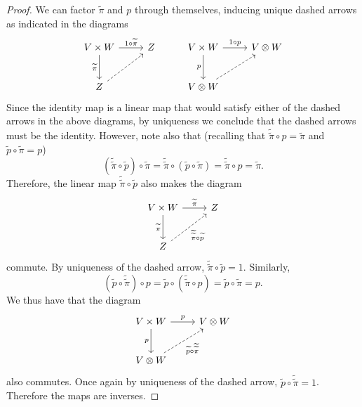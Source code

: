\documentclass[11pt, letterpaper]{article}
\begin{document}
\begin{proof}
	We can factor $\widetilde{\pi } $ and $p$ through themselves, inducing unique dashed arrows as indicated in the diagrams
	\[\begin{tikzcd}[row sep = 2.5em, column sep = 2.5em]
	V\times W \ar[" \widetilde{\pi }  "', d] \ar[" 1 \circ \widetilde{\pi }  ", r]  & Z & V\times W \ar[" p "', d] \ar[" 1\circ p ", r]  & V\otimes W \\
	Z \ar[dashed, ur]  &  & V\otimes W \ar[dashed, ur]  & 
	\end{tikzcd}\]
	Since the identity map is a linear map that would satisfy either of the dashed arrows in the above diagrams, by uniqueness we conclude that the dashed arrows must be the identity. However, note also that (recalling that $\widetilde{\widetilde{\pi } } \circ p= \widetilde{\pi } $ and $\widetilde{p} \circ \widetilde{\pi } =p$)
	\[
		(\widetilde{\widetilde{\pi } } \circ \widetilde{p})\circ \widetilde{\pi } =\widetilde{\widetilde{\pi } } \circ (\widetilde{p} \circ \widetilde{\pi } )=\widetilde{\widetilde{\pi } } \circ p=\widetilde{\pi } 
	.\]
	Therefore, the linear map $\widetilde{\widetilde{\pi } } \circ \widetilde{p} $ also makes the diagram
	\[\begin{tikzcd}[row sep = 2.5em, column sep = 2.5em]
	V\times W \ar[" \widetilde{\pi }  ", r] \ar[" \widetilde{\pi }  "', d]  & Z \\
	Z \ar[" \widetilde{\widetilde{\pi } } \circ \widetilde{p} "', dashed, ur]  & 
	\end{tikzcd}\]
	commute. By uniqueness of the dashed arrow, $\widetilde{\widetilde{\pi } } \circ \widetilde{p} =1$. Similarly,
	\[
		(\widetilde{p} \circ \widetilde{\widetilde{\pi } } )\circ p = \widetilde{p} \circ (\widetilde{\widetilde{\pi } } \circ p)=\widetilde{p} \circ \widetilde{\pi } =p
	.\]
	We thus have that the diagram
	\[\begin{tikzcd}[row sep = 2.5em, column sep = 2.5em]
	V\times W \ar[" p ", r] \ar[" p "', d]  & V\otimes W \\
	V\otimes W \ar[" \widetilde{p} \circ \widetilde{\widetilde{\pi } }  "', dashed, ur]  & 
	\end{tikzcd}\]
	also commutes. Once again by uniqueness of the dashed arrow, $\widetilde{p} \circ \widetilde{\widetilde{\pi } } =1$. Therefore the maps are inverses.
\end{proof}
\end{document}
